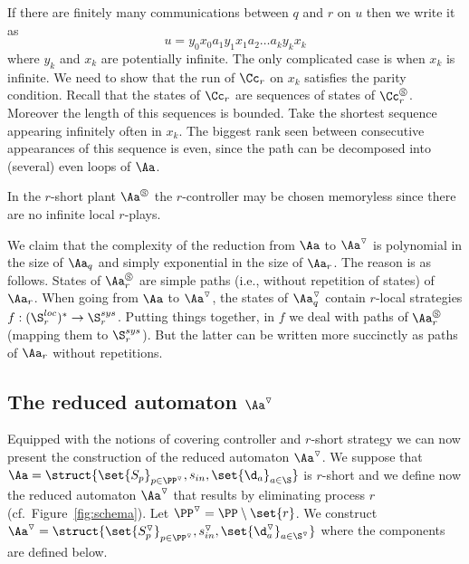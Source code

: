 \documentclass[10pt,a4paper]{article}
\newcommand{\igw}[1]{}
\newcommand{\red}[1]{#1^\triangledown}
\newcommand{\short}[1]{#1^\circledS}
\newcommand{\Sloc}{\S^{loc}}
\newcommand{\Ssys}{\S^{sys}}
\begin{document}
  If there are finitely many communications between $q$ and $r$ on
  $u$ then we write it as
  \begin{equation}u=y_0x_0a_1y_1x_1a_2\dots a_ky_kx_k
  \end{equation} where $y_k$ and $x_k$ are potentially infinite. The
  only complicated case is when $x_k$ is infinite. We need to show that
  the run of $\Cc_r$ on $x_k$ satisfies the parity condition. Recall
  that the states of $\Cc_r$ are  sequences of states of
  $\short\Cc_r$. Moreover the length of this 
  sequences is bounded. Take the shortest sequence appearing infinitely
  often in $x_k$. The biggest rank seen between consecutive appearances of this
  sequence is even, since the path can be decomposed into
  (several) even loops of $\Aa$.


\medskip

\begin{corollary}
  In the $r$-short plant $\short\Aa$ the $r$-controller may be chosen
  memoryless since there are no infinite local $r$-plays.\igw{remove corollary?}
\end{corollary}


\begin{remark}
  We claim that the complexity of the reduction from $\Aa$ to $\red\Aa$ is
  polynomial in the size of $\Aa_q$ and simply exponential in the size
  of $\Aa_r$. The reason is as follows. States of $\short\Aa_r$ are
  simple paths  (i.e., without repetition of states) of $\Aa_r$. When going from
  $\Aa$ to $\red\Aa$, the states of $\red\Aa_q$ contain $r$-local
  strategies $f :(\Sloc_r)^* \to \Ssys_r$. Putting things together, in $f$
  we deal with paths of $\short\Aa_r$ (mapping them to $\Ssys_r$). But the latter
  can be written more succinctly as paths of $\Aa_r$ without repetitions.
\end{remark}






\subsection{The reduced automaton $\red\Aa$}\label{sec:new} 
Equipped with the notions of covering controller and $r$-short strategy
we can now present the construction of the reduced automaton $\red
\Aa$. We suppose that $\Aa=\struct{\set{S_p}_{p\in
    \red\PP},s_{in},\set{\d_a}_{a\in\S}}$ is
$r$-short and we define now the reduced automaton $\red\Aa$ that results
by eliminating process $r$ (cf.\ Figure~\ref{fig:schema}).  Let
$\red\PP=\PP\setminus \set{r}$.  We construct
$\red\Aa=\struct{\set{\red{S_p}}_{p\in
    \red\PP},\red{s_{in}},\set{\red{\d_a}}_{a\in\red\S}}$ where the
components are defined below.
\end{document}
